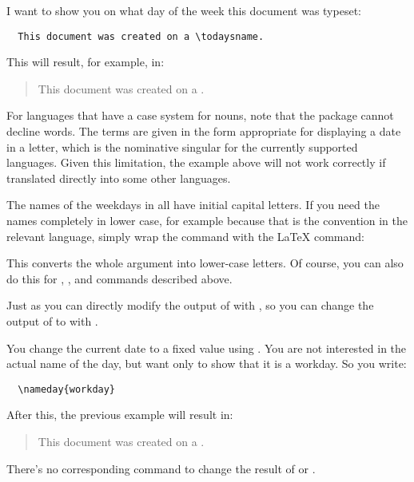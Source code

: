 \begin{Example}
  I want to show you on what day of the week this document was typeset:
\begin{lstlisting}
  This document was created on a \todaysname.
\end{lstlisting}
  This will result, for example, in:
  \begin{quote}
    This document was created on a \todaysname.
  \end{quote}
\end{Example}

For languages that have a case system for nouns, note that the package cannot
decline words. The terms are given in the form appropriate for displaying a
date in a letter, which is the nominative singular for the currently supported
languages. Given this limitation, the example above will not work correctly if
translated directly into some other languages.

\begin{Explain}
  The names of the weekdays in  all have
  initial capital letters. If you need the names completely in lower case, for
  example because that is the convention in the relevant language, simply wrap
  the command with the \LaTeX{} %
   command:
\begin{lstcode}
  \MakeLowercase{\todaysname}
\end{lstcode}
  This converts the whole argument into lower-case letters. Of course, you can
  also do this for
  ,
  , and
   commands described
  above.%
\end{Explain}%
\EndIndexGroup


\begin{Declaration}
\end{Declaration}%
Just as you can directly modify the output of  with
, so you can change the output of
 to  with .
\begin{Example}
  You change the current date to a fixed value using
  . You are not interested in the actual name of the
  day, but want only to show that it is a workday. So you write:
\begin{lstlisting}
  \nameday{workday}
\end{lstlisting}
  After this, the previous example will result in:
  \begin{quote}
    This document was created on a \todaysname.
  \end{quote}
\end{Example}
There's no corresponding command to change the result of
 or
.%
\EndIndexGroup


